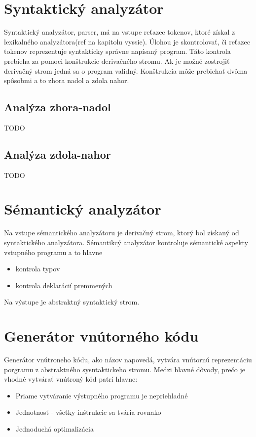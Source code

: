 \section{Syntaktický analyzátor}
Syntaktický analyzátor, parser, má na vstupe reťazec tokenov, ktoré získal
z lexikalného analyzátora(ref na kapitolu vyssie). Úlohou je skontrolovať, či
reťazec tokenov reprezentuje syntakticky správne napísaný program. Táto kontrola
prebieha za pomoci konštrukcie derivačného stromu. Ak je možné zostrojiť derivačný strom
jedná sa o program validný. Konštrukcia môže prebiehať dvôma spôsobmi a to zhora
nadol a zdola nahor.

\subsection{Analýza zhora-nadol}
TODO
\subsection{Analýza zdola-nahor}
TODO

\section{Sémantický analyzátor}
Na vstupe sémantického analyzátoru je derivačný strom, ktorý bol získaný od
syntaktického analyzátora. Sémantikcý analyzátor kontroluje sémantické aspekty
vstupného programu a to hlavne 
\begin{itemize}
    \item kontrola typov
    \item kontrola deklarácií premmených
\end{itemize}
Na výstupe je abstraktný syntaktický strom.

\section{Generátor vnútorného kódu}
Generátor vnútroneho kódu, ako názov napovedá, vytvára vnútornú reprezentáciu porgramu
z abstraktného sysntaktickeho stromu. Medzi hlavné dôvody, prečo je vhodné
vytvárať vnútroný kód patrí hlavne:
\begin{itemize}
    \item Priame vytváranie výstupného programu je nepriehladné
    \item Jednotnosť - všetky inštrukcie sa tvária rovnako
    \item Jednoduchá optimalizácia
\end{itemize}

